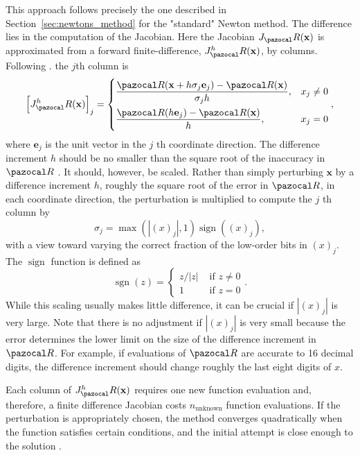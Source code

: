 This approach follows precisely the one described in Section~\ref{sec:newtons_method} for the "standard" Newton method.
The difference lies in the computation of the Jacobian.
Here the Jacobian \(J_\pazocal R(\mathbf x)\) is approximated from a forward finite-difference, \(J^h_\pazocal R(\mathbf x)\), by columns.
Following \cite{kelley_solving_2003}. the \(j\)th column is
\begin{equation}
\left[J^h_\pazocal R(\mathbf x)\right]_{j}=
\begin{cases}
  \displaystyle\frac{\pazocal R(\mathbf x + h \sigma_{j} \mathbf e_{j})-\pazocal R(\mathbf x)}{\sigma_{j} h}, & x_{j} \neq 0 \\[10pt]
  \displaystyle\frac{\pazocal R(h \mathbf e_{j})-\pazocal R(\mathbf x)}{h}, & x_{j}=0
\end{cases},
\end{equation}
where \(\mathbf e_{j}\) is the unit vector in the \(j\) th coordinate direction.
The difference increment \(h\) should be no smaller than the square root of the inaccuracy in \(\pazocal R\) \citep{kelley_solving_2003}.
It should, however, be scaled.
Rather than simply perturbing \(\mathbf x\) by a difference increment \(h\), roughly the square root of the error in \(\pazocal R\), in each coordinate direction, the perturbation is multiplied to compute the \(j\) th column by
\begin{equation}
  \sigma_j = \max (|(x)_{j}|, 1) \operatorname{sign}((x)_{j}),
\end{equation}
with a view toward varying the correct fraction of the low-order bits in \((x)_{j}\).
The \(\operatorname{sign}\) function is defined as
\begin{equation}
  \operatorname{sgn}(z)=\begin{cases}
  z /|z| & \text { if } z \neq 0 \\
  1 & \text { if } z=0
  \end{cases}.
\end{equation}
While this scaling usually makes little difference, it can be crucial if \(|(x)_{j}|\) is very large.
Note that there is no adjustment if \(|(x)_{j}|\) is very small because the error determines the lower limit on the size of the difference increment in \(\pazocal R\).
For example, if evaluations of \(\pazocal R\) are accurate to 16 decimal digits, the difference increment should change roughly the last eight digits of \(x\). \citep{kelley_solving_2003}

Each column of \(J^h_\pazocal R(\mathbf x)\) requires one new function evaluation and, therefore, a finite difference Jacobian costs \(n_\text{unknown}\) function evaluations.
If the perturbation is appropriately chosen, the method converges quadratically when the function satisfies certain conditions, and the initial attempt is close enough to the solution \citep{dennis_numerical_1996}.

